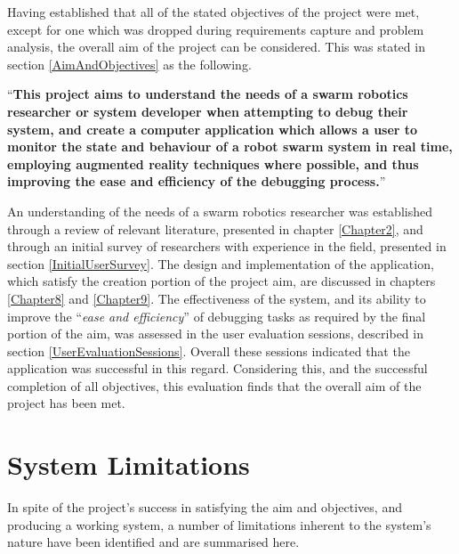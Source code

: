 Having established that all of the stated objectives of the project were met, except for one which was dropped during requirements capture and problem analysis, the overall aim of the project can be considered. This was stated in section \ref{AimAndObjectives} as the following.

``\textbf{This project aims to understand the needs of a swarm robotics researcher or system developer when attempting to debug their system, and create a computer application which allows a user to monitor the state and behaviour of a robot swarm system in real time, employing augmented reality techniques where possible, and thus improving the ease and efficiency of the debugging process.}''

An understanding of the needs of a swarm robotics researcher was established through a review of relevant literature, presented in chapter \ref{Chapter2}, and through an initial survey of researchers with experience in the field, presented in section \ref{InitialUserSurvey}. The design and implementation of the application, which satisfy the creation portion of the project aim, are discussed in chapters \ref{Chapter8} and \ref{Chapter9}. The effectiveness of the system, and its ability to improve the ``\textit{ease and efficiency}'' of debugging tasks as required by the final portion of the aim, was assessed in the user evaluation sessions, described in section \ref{UserEvaluationSessions}. Overall these sessions indicated that the application was successful in this regard. Considering this, and the successful completion of all objectives, this evaluation finds that the overall aim of the project has been met.


\section{System Limitations}

In spite of the project's success in satisfying the aim and objectives, and producing a working system, a number of limitations inherent to the system's nature have been identified and are summarised here.

